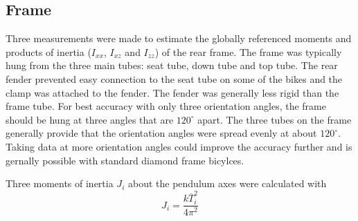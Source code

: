 \documentclass{bmd2010p}
\begin{document}
\subsection{Frame}
Three measurements were made to estimate the globally referenced moments and
products of inertia ($I_{xx}$, $I_{xz}$ and $I_{zz}$) of the rear frame. The
frame was typically hung from the three main tubes: seat tube, down tube
and top tube. The rear fender prevented easy connection to the seat tube on
some of the bikes and the clamp was attached to the fender. The fender was
generally less rigid than the frame tube. For best accuracy with only three orientation angles, the frame
should be hung at three angles that are $120^\circ$ apart. The three tubes on
the frame generally provide that the orientation angles were spread evenly at
about $120^\circ$. Taking data at more orientation angles could improve the accuracy further and
is gernally possible with standard diamond frame bicylces.

Three moments of inertia $J_{i}$ about the pendulum axes were calculated with
\begin{equation}
	J_i=\frac{k\overline{T}_i^2}{4\pi^2}
\label{eq:torPend}
\end{equation}
\end{document}
